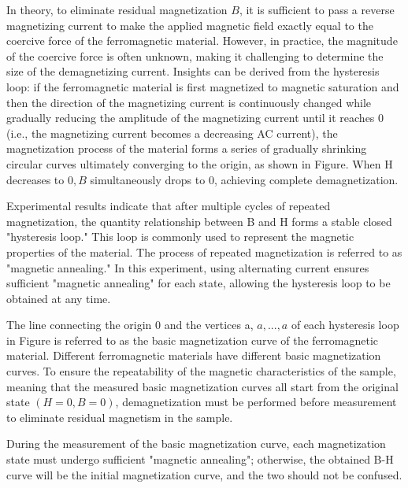 \documentclass[UTF8]{article}
\begin{document}
    In theory, to eliminate residual magnetization $B$, it is sufficient to pass a reverse magnetizing current to make the applied magnetic field exactly equal to the coercive force of the ferromagnetic material. However, in practice, the magnitude of the coercive force is often unknown, making it challenging to determine the size of the demagnetizing current. Insights can be derived from the hysteresis loop: if the ferromagnetic material is first magnetized to magnetic saturation and then the direction of the magnetizing current is continuously changed while gradually reducing the amplitude of the magnetizing current until it reaches $0$ (i.e., the magnetizing current becomes a decreasing AC current), the magnetization process of the material forms a series of gradually shrinking circular curves ultimately converging to the origin, as shown in Figure. When H decreases to $0, B$ simultaneously drops to $0$, achieving complete demagnetization. 
    
    Experimental results indicate that after multiple cycles of repeated magnetization, the quantity relationship between B and H forms a stable closed "hysteresis loop." This loop is commonly used to represent the magnetic properties of the material. The process of repeated magnetization is referred to as "magnetic annealing." In this experiment, using alternating current ensures sufficient "magnetic annealing" for each state, allowing the hysteresis loop to be obtained at any time. 
    
    The line connecting the origin $0$ and the vertices a, $a, ..., a$ of each hysteresis loop in Figure is referred to as the basic magnetization curve of the ferromagnetic material. Different ferromagnetic materials have different basic magnetization curves. To ensure the repeatability of the magnetic characteristics of the sample, meaning that the measured basic magnetization curves all start from the original state $(H = 0, B = 0)$, demagnetization must be performed before measurement to eliminate residual magnetism in the sample. 
    
    During the measurement of the basic magnetization curve, each magnetization state must undergo sufficient "magnetic annealing"; otherwise, the obtained B-H curve will be the initial magnetization curve, and the two should not be confused.     
   
\end{document}
